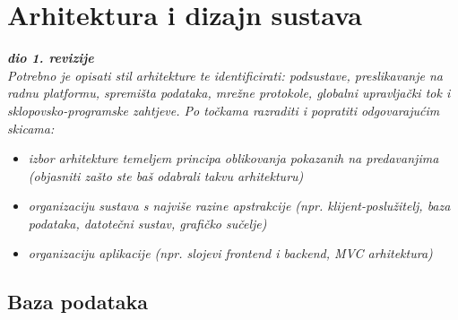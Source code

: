\chapter{Arhitektura i dizajn sustava}
		
		\textbf{\textit{dio 1. revizije}}\\

		\textit{ Potrebno je opisati stil arhitekture te identificirati: podsustave, preslikavanje na radnu platformu, spremišta podataka, mrežne protokole, globalni upravljački tok i sklopovsko-programske zahtjeve. Po točkama razraditi i popratiti odgovarajućim skicama:}
	\begin{itemize}
		\item 	\textit{izbor arhitekture temeljem principa oblikovanja pokazanih na predavanjima (objasniti zašto ste baš odabrali takvu arhitekturu)}
		\item 	\textit{organizaciju sustava s najviše razine apstrakcije (npr. klijent-poslužitelj, baza podataka, datotečni sustav, grafičko sučelje)}
		\item 	\textit{organizaciju aplikacije (npr. slojevi frontend i backend, MVC arhitektura) }		
	\end{itemize}

	
		

		

				
		\section{Baza podataka}
			
